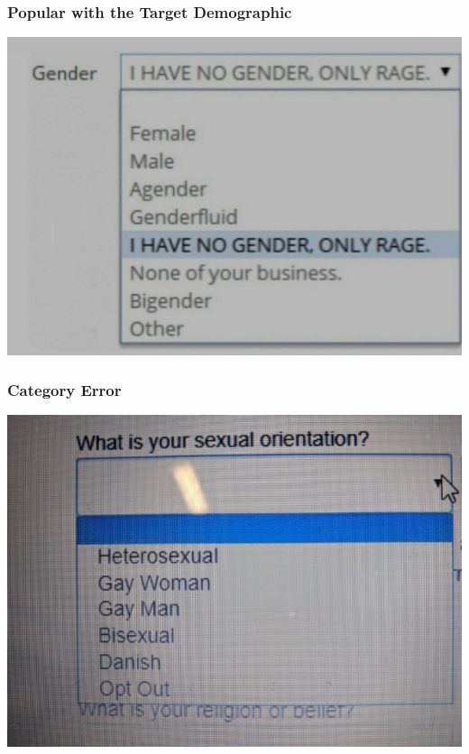 \documentclass[aspectratio=169,x11names]{beamer}
\begin{document}
\begin{frame}
\frametitle{Popular with the Target Demographic}
\begin{center}
\includegraphics[height=0.725\textheight,keepaspectratio]{images/gender_RAGE.jpg} 
\end{center}
\end{frame}

\begin{frame}
\frametitle{Category Error}
\begin{center}
\includegraphics[height=0.7\textheight,keepaspectratio]{images/theashencouncil_01.png} 
\end{center}
\end{frame}

\end{document}
